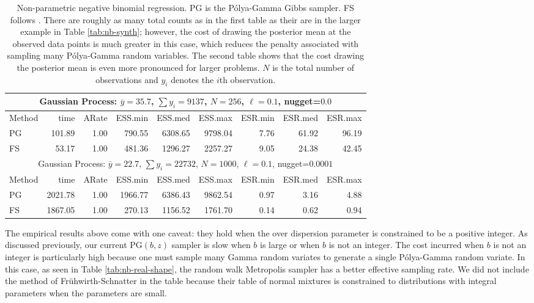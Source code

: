 \documentclass[11pt]{article}
\newcommand{\Polya}{P\'{o}lya}
\newcommand{\PG}{\text{PG}}
\newcommand{\tablesize}{\small}
\begin{document}
\begin{table}
\tablesize
\centering
\label{tab:nb-gp-ex01}
\begin{tabular}{l r r r r r r r r } 
\hline
\multicolumn{9}{c}{Gaussian Process: $\bar y = 35.7$, $\sum y_i = 9137$, $N=256$, $\ell=0.1$, nugget=$0.0$} \\
\hline
Method  &     time &    ARate &  ESS.min &  ESS.med &  ESS.max &  ESR.min &  ESR.med &  ESR.max \\ 
    PG  &   101.89 &     1.00 &   790.55 &  6308.65 &  9798.04 &     7.76 &    61.92 &    96.19 \\ 
    FS  &    53.17 &     1.00 &   481.36 &  1296.27 &  2257.27 &     9.05 &    24.38 &    42.45 \\

\hline
\multicolumn{9}{c}{Gaussian Process: $\bar y = 22.7$, $\sum y_i = 22732$, $N=1000$, $\ell=0.1$, nugget=$0.0001$} \\
\hline
Method  &     time &    ARate &  ESS.min &  ESS.med &  ESS.max &  ESR.min &  ESR.med &  ESR.max \\ 
    PG  &  2021.78 &     1.00 &  1966.77 &  6386.43 &  9862.54 &     0.97 &     3.16 &     4.88 \\ 
    FS  &  1867.05 &     1.00 &   270.13 &  1156.52 &  1761.70 &     0.14 &     0.62 &     0.94

 \end{tabular}
 \caption{Non-parametric negative binomial regression.  PG is the \Polya-Gamma Gibbs sampler.  FS follows
   \cite{fruhwirth-schnatter-etal-2009}.  There are roughly as many total counts
   as in the first table as their are in the larger example in Table \ref{tab:nb-synth}; however, the cost of
   drawing the posterior mean at the observed data points is much greater in
   this case, which reduces the penalty associated with sampling many
   \Polya-Gamma random variables.  The second table shows that the cost drawing
   the posterior mean is even more pronounced for larger problems.  $N$ is the
   total number of observations and $y_i$ denotes the $i$th observation.}
\end{table}

The empirical results above come with one caveat: they hold when the over
dispersion parameter is constrained to be a positive integer.  As discussed
previously, our current $\PG(b,z)$ sampler is slow when $b$ is large or when $b$
is not an integer.  The cost incurred when $b$ is not an integer is particularly
high because one must sample many Gamma random variates to generate a single
\Polya-Gamma random variate.  In this case, as seen in Table
\ref{tab:nb-real-shape}, the random walk Metropolis sampler has a better
effective sampling rate.  We did not include the method of
Fr\"{u}hwirth-Schnatter in the table because their table of normal mixtures is
constrained to distributions with integral parameters when the parameters are
small.
\end{document}

